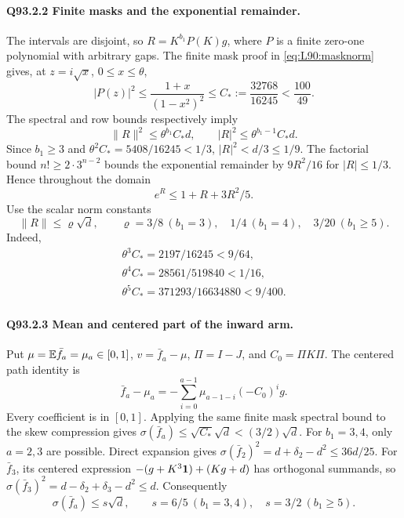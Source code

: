 \paragraph{Q93.2.2 Finite masks and the exponential remainder.}
The intervals are disjoint, so \(R=K^{b_1}P(K)g\), where \(P\) is a
finite zero-one polynomial with arbitrary gaps. The finite mask proof
in \eqref{eq:L90:masknorm} gives, at \(z=i\sqrt x\), \(0\le x\le\theta\),
\begin{equation}\tag{Q93.2.4}\label{eq:Q93:2.4}
|P(z)|^2\le\frac{1+x}{(1-x^2)^2}
\le C_*:=\frac{32768}{16245}<\frac{100}{49}.
\end{equation}
The spectral and row bounds respectively imply
\begin{equation}\tag{Q93.2.5}\label{eq:Q93:2.5}
\|R\|^2\le\theta^{b_1}C_*d,\qquad
|R|^2\le\theta^{b_1-1}C_*d.
\end{equation}
Since \(b_1\ge3\) and \(\theta^2C_*=5408/16245<1/3\),
\(|R|^2<d/3\le1/9\). The factorial bound
\(n!\ge2\cdot3^{n-2}\) bounds the exponential remainder by \(9R^2/16\)
for \(|R|\le1/3\). Hence throughout the domain
\begin{equation}\tag{Q93.2.6}\label{eq:Q93:2.6}
e^R\le1+R+3R^2/5.
\end{equation}
Use the scalar norm constants
\begin{equation}\tag{Q93.2.7}\label{eq:Q93:2.7}
\|R\|\le\varrho\sqrt d,\qquad
\varrho=3/8\ (b_1=3),\quad1/4\ (b_1=4),\quad3/20\ (b_1\ge5).
\end{equation}
Indeed,
\[
\begin{gathered}
\theta^3C_*=2197/16245<9/64,\\
\theta^4C_*=28561/519840<1/16,\\
\theta^5C_*=371293/16634880<9/400.
\end{gathered}
\]

\paragraph{Q93.2.3 Mean and centered part of the inward arm.}
Put \(\mu=\mathbb E\bar f_a=\mu_a\in[0,1]\), \(v=\bar f_a-\mu\),
\(\Pi=I-J\), and \(C_0=\Pi K\Pi\). The centered path identity is
\begin{equation}\tag{Q93.2.8}\label{eq:Q93:2.8}
\bar f_a-\mu_a=-\sum_{i=0}^{a-1}\mu_{a-1-i}(-C_0)^ig.
\end{equation}
Every coefficient is in \([0,1]\). Applying the same finite mask
spectral bound to the skew compression gives
\(\sigma(\bar f_a)\le\sqrt{C_*}\sqrt d<(3/2)\sqrt d\).
For \(b_1=3,4\), only \(a=2,3\) are possible. Direct expansion gives
\(\sigma(\bar f_2)^2=d+\delta_2-d^2\le36d/25\).
For \(\bar f_3\), its centered expression
\(-(g+K^3\mathbf1)+(Kg+d)\) has orthogonal summands, so
\(\sigma(\bar f_3)^2=d-\delta_2+\delta_3-d^2\le d\).
Consequently
\begin{equation}\tag{Q93.2.9}\label{eq:Q93:2.9}
\sigma(\bar f_a)\le s\sqrt d,\qquad
s=6/5\ (b_1=3,4),\quad s=3/2\ (b_1\ge5).
\end{equation}

